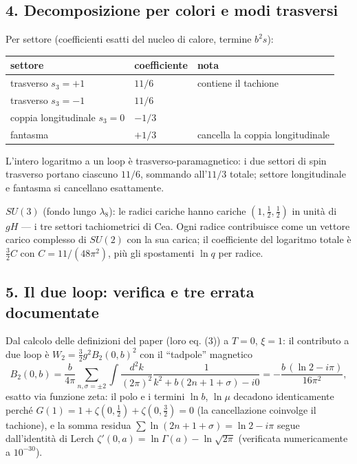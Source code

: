 \documentclass[
]{article}
\begin{document}
\hypertarget{decomposizione-per-colori-e-modi-trasversi}{%
\subsection{4. Decomposizione per colori e modi
trasversi}\label{decomposizione-per-colori-e-modi-trasversi}}

Per settore (coefficienti esatti del nucleo di calore, termine
\(b^2 s\)):

\begin{longtable}[]{@{}lll@{}}
\toprule\noalign{}
settore & coefficiente & nota \\
\midrule\noalign{}
\endhead
\bottomrule\noalign{}
\endlastfoot
trasverso \(s_3 = +1\) & \(11/6\) & contiene il tachione \\
trasverso \(s_3 = -1\) & \(11/6\) & \\
coppia longitudinale \(s_3 = 0\) & \(-1/3\) & \\
fantasma & \(+1/3\) & cancella la coppia longitudinale \\
\end{longtable}

L'intero logaritmo a un loop è trasverso-paramagnetico: i due settori di
spin trasverso portano ciascuno \(11/6\), sommando all'\(11/3\) totale;
settore longitudinale e fantasma si cancellano esattamente.

\textbf{\(SU(3)\)} (fondo lungo \(\lambda_8\)): le radici cariche hanno
cariche \((1, \tfrac12, \tfrac12)\) in unità di \(gH\) --- i tre settori
tachiometrici di Cea. Ogni radice contribuisce come un vettore carico
complesso di \(SU(2)\) con la sua carica; il coefficiente del logaritmo
totale è \(\tfrac32 C\) con \(C = 11/(48\pi^2)\), più gli spostamenti
\(\ln q\) per radice.

\hypertarget{il-due-loop-verifica-e-tre-errata-documentate}{%
\subsection{5. Il due loop: verifica e tre errata
documentate}\label{il-due-loop-verifica-e-tre-errata-documentate}}

Dal calcolo delle definizioni del paper (loro eq. (3)) a \(T=0\),
\(\xi = 1\): il contributo a due loop è
\(W_2 = \tfrac32 g^2 B_2(0,b)^2\) con il ``tadpole'' magnetico
\[B_2(0,b) = \frac{b}{4\pi}\sum_{n,\sigma=\pm2}\int\frac{d^2k}{(2\pi)^2}\frac{1}{k^2 + b(2n+1+\sigma) - i0} = -\frac{b\,(\ln 2 - i\pi)}{16\pi^2},\]
esatto via funzione zeta: il polo e i termini \(\ln b\), \(\ln\mu\)
decadono identicamente perché
\(G(1) = 1 + \zeta(0,\tfrac12) + \zeta(0,\tfrac32) = 0\) (la
cancellazione coinvolge il tachione), e la somma residua
\(\sum \ln(2n+1+\sigma) = \ln 2 - i\pi\) segue dall'identità di Lerch
\(\zeta'(0,a) = \ln\Gamma(a) - \ln\sqrt{2\pi}\) (verificata
numericamente a \(10^{-30}\)).
\end{document}
